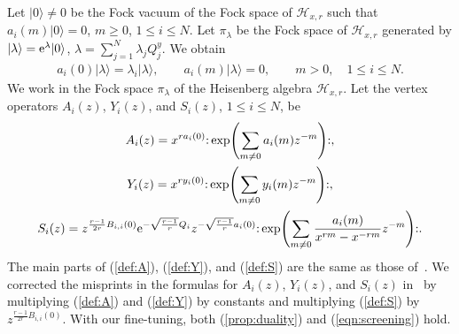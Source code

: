 \documentclass[10pt,a4paper]{amsart}
\numberwithin{equation}{section}
\begin{document}
Let $|0\rangle \neq 0$ be the Fock vacuum of the Fock space
of ${\mathcal H}_{x,r}$ such that $a_i(m)|0\rangle=0$, $m \geq 0$, $1\leq i \leq N$.
Let $\pi_\lambda$ be the Fock space of ${\mathcal H}_{x,r}$
generated by $|\lambda \rangle={\rm e}^{\lambda}|0\rangle$,
$\lambda=\sum_{j=1}^N\lambda_j Q_j^y$. We obtain
\begin{gather}
a_i(0)|\lambda\rangle=\lambda_i|\lambda\rangle,\qquad
a_i(m)|\lambda \rangle=0, \qquad
m>0,\quad 1\leq i \leq N.
\label{def:Fock}
\end{gather}
We work in the Fock space $\pi_\lambda$ of the Heisenberg algebra ${\mathcal H}_{x,r}$.
Let the vertex operators $A_i(z)$, $Y_i(z)$, and $S_i(z)$, $1\leq i \leq N$, be
\begin{gather}
A_i(z)=x^{r a_i(0)}{:}\exp\Biggl(\sum_{m \neq 0}a_i(m)z^{-m}\Biggr){:},
\label{def:A}
\\
Y_i(z)=x^{r y_i(0)}{:}\exp\Biggl(\sum_{m \neq 0}y_i(m)z^{-m}\Biggr){:},
\label{def:Y}
\\
S_i(z)=z^{\frac{r-1}{2r}B_{i,i}(0)}{\rm e}^{-\sqrt{\frac{r-1}{r}}Q_i}z^{-\sqrt{\frac{r-1}{r}}a_i(0)}
{:}\exp\Biggl(\sum_{m \neq 0}\frac{a_i(m)}{x^{rm}-x^{-rm}}z^{-m}\Biggr){:}.
\label{def:S}
\end{gather}
The main parts of (\ref{def:A}), (\ref{def:Y}), and (\ref{def:S})
are the same as those of~\cite{Frenkel-Reshetikhin1}.
We corrected the misprints in the formulas for $A_i(z)$, $Y_i(z)$, and $S_i(z)$ in~\cite{Frenkel-Reshetikhin1} by multiplying (\ref{def:A}) and (\ref{def:Y}) by constants and multiplying (\ref{def:S}) by $z^{\frac{r-1}{2r}B_{i,i}(0)}$.
With our fine-tuning, both (\ref{prop:duality}) and (\ref{eqn:screening}) hold.
\end{document}
